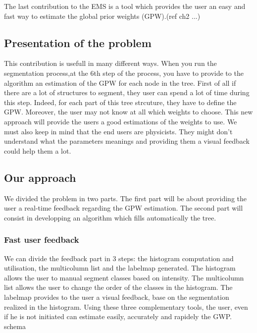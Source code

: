 The last contribution to the EMS is a tool which provides the user an easy and fast way to estimate the global prior weights (GPW).(ref ch2 ...)

\subsection{Presentation of the problem}
This contribution is usefull in many different ways.
When you run the segmentation process,at the 6th step of the process, you have to provide to the algorithm an estimation of the GPW for each node in the tree. 
First of all if there are a lot of structures to segment, they user can spend a lot of time during this step. Indeed, for each part of this tree strcuture, they have to define the GPW. Moreover, the user may not know at all which weights to choose. This new approach will provide the users a good estimations of the weights to use. We must also keep in mind that the end users are physicists. They might don't understand what the parameters meanings and providing them a visual feedback could help them a lot.
\subsection{Our approach}
We divided the problem in two parts. The first part will be about providing the user a real-time feedback regarding the GPW estimation.
The second part will consist in developping an algorithm which fills automatically the tree.
\subsubsection{Fast user feedback}
We can divide the feedback part in 3 steps: the histogram computation and utilisation, the multicolumn list and the labelmap generated.
The histogram allows the user to manual segment classes based on intensity.
The multicolumn list allows the user to change the order of the classes in the histogram.
The labelmap provides to the user a visual feedback, base on the segmentation realized in the histogram.
Using these three complementary tools, the user, even if he is not initiated can estimate easily, accurately and rapidely the GWP.
\\schema
